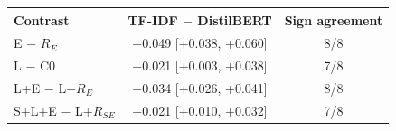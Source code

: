 \begin{tabular}{@{}lcc@{}}
\toprule
Contrast & TF-IDF $-$ DistilBERT & Sign agreement\\
\midrule
E $-$ $R_E$ & +0.049 [+0.038, +0.060] & 8/8\\
L $-$ C0 & +0.021 [+0.003, +0.038] & 7/8\\
L+E $-$ L+$R_E$ & +0.034 [+0.026, +0.041] & 8/8\\
S+L+E $-$ L+$R_{SE}$ & +0.021 [+0.010, +0.032] & 7/8\\
\bottomrule
\end{tabular}
